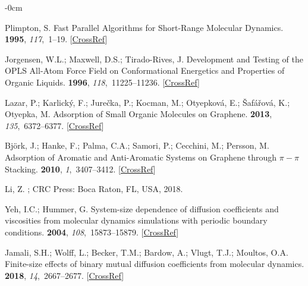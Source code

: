 \documentclass[molecules,article,accept,pdftex,moreauthors]{Definitions/mdpi}
\begin{document}
\begin{adjustwidth}{-\extralength}{0cm}
\begin{thebibliography}{999}
Plimpton, S.
\newblock Fast Parallel Algorithms for Short-Range Molecular Dynamics.
 {\bf 1995}, {\em 117},~1--19. [\href{http://dx.doi.org/10.1006/jcph.1995.1039}{CrossRef}]

Jorgensen, W.L.; Maxwell, D.S.; Tirado-Rives, J.
\newblock Development and Testing of the OPLS All-Atom Force Field on
Conformational Energetics and Properties of Organic Liquids.
 {\bf 1996}, {\em 118},~11225--11236. [\href{http://dx.doi.org/10.1021/ja9621760}{CrossRef}]

Lazar, P.; Karlick{\'y}, F.; Jure{\v c}ka, P.; Kocman, M.; Otyepkov{\'a}, E.;
{\v S}af{\'a}{\v r}ov{\'a}, K.; Otyepka, M.
\newblock Adsorption of Small Organic Molecules on Graphene.
 {\bf 2013}, {\em 135},~6372--6377. [\href{http://dx.doi.org/10.1021/ja403162r}{CrossRef}]

Bj{\"o}rk, J.; Hanke, F.; Palma, C.A.; Samori, P.; Cecchini, M.; Persson, M.
\newblock Adsorption of Aromatic and Anti-Aromatic Systems on Graphene through
$\pi-\pi$ Stacking.
 {\bf 2010}, {\em 1},~3407--3412. [\href{http://dx.doi.org/10.1021/jz101360k}{CrossRef}]

Li, Z.
; CRC Press: Boca Raton, FL, USA, 
2018.

Yeh, I.C.; Hummer, G.
\newblock System-size dependence of diffusion coefficients and viscosities from
molecular dynamics simulations with periodic boundary conditions.
 {\bf 2004}, {\em 108},~15873--15879. [\href{http://dx.doi.org/10.1021/jp0477147}{CrossRef}]

Jamali, S.H.; Wolff, L.; Becker, T.M.; Bardow, A.; Vlugt, T.J.; Moultos, O.A.
\newblock Finite-size effects of binary mutual diffusion coefficients from
molecular dynamics.
 {\bf 2018}, {\em 14},~2667--2677. [\href{http://dx.doi.org/10.1021/acs.jctc.8b00170}{CrossRef}]


\end{thebibliography}
\end{adjustwidth}
\end{document}
